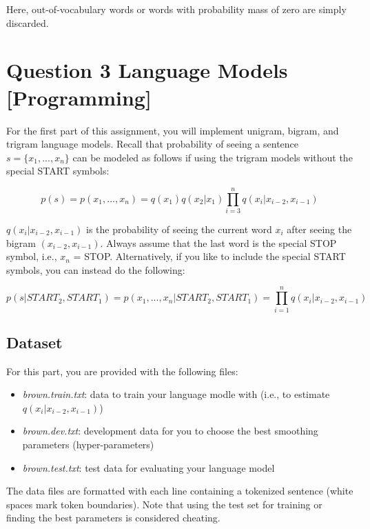 \documentclass[11pt]{article}
\begin{document}
Here, out-of-vocabulary words or words with probability mass of zero are simply discarded.

\section*{Question 3 Language Models [Programming]}

For the first part of this assignment, you will implement unigram, bigram, and trigram language models. Recall that probability of seeing a sentence $s = \{x_1,...,x_n\}$ can be modeled as follows if using the trigram models without the special START symbols:

\begin{equation}
	p(s) = p(x_1,...,x_n) = q(x_1)q(x_2|x_1){\displaystyle \prod_{i=3}^{n} q(x_i | x_{i-2}, x_{i-1})}
\end{equation}

$q(x_i | x_{i-2}, x_{i-1})$ is the probability of seeing the current word $x_i$ after seeing the bigram $(x_{i-2}, x_{i-1})$. Always assume that the last word is the special STOP symbol, i.e., $x_n$ = STOP. Alternatively, if you like to include the special START symbols, you can instead do the following:

\begin{equation}
	p(s|START_2, START_1) = p(x_1,...,x_n|START_2, START_1) = {\displaystyle \prod_{i=1}^{n} q(x_i | x_{i-2}, x_{i-1})}
\end{equation}

\subsection*{Dataset}

For this part, you are provided with the following files:
\begin{itemize}
  \item \textit{brown.train.txt}: data to train your language modle with (i.e., to estimate $q(x_i|x_{i-2}, x_{i-1})$)
  \item \textit{brown.dev.txt}: development data for you to choose the best smoothing parameters (hyper-parameters)
  \item \textit{brown.test.txt}: test data for evaluating your language model
\end{itemize}

The data files are formatted with each line containing a tokenized sentence (white spaces mark token boundaries). Note that using the test set for training or finding the best parameters is considered cheating. 
\end{document}
